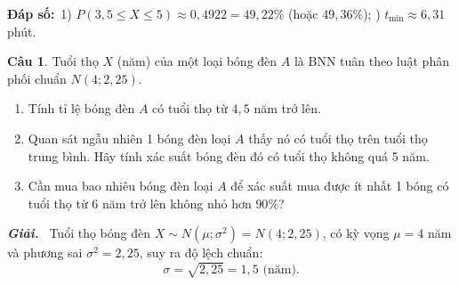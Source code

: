 \documentclass[12pt,a4paper]{article}
\theoremstyle{definition}
\newtheorem{cau}{Câu}
\newcommand{\giai}{\noindent\textbf{\textit{Giải.}}\ }
\newcommand{\dapso}[1]{\noindent\textbf{Đáp số:}\ #1}
\begin{document}
\dapso{1) $P(3{,}5 \le X \le 5) \approx 0{,}4922 = 49{,}22\%$ (hoặc $49{,}36\%$); \quad 2) $t_{\min} \approx 6{,}31$ phút.}

\vspace{1.5em}
\begin{cau}
Tuổi thọ $X$ (năm) của một loại bóng đèn $A$ là BNN tuân theo luật phân phối chuẩn $N(4; 2{,}25)$.
\begin{enumerate}[label=\alph*.]
    \item Tính tỉ lệ bóng đèn $A$ có tuổi thọ từ $4{,}5$ năm trở lên.
    \item Quan sát ngẫu nhiên 1 bóng đèn loại $A$ thấy nó có tuổi thọ trên tuổi thọ trung bình. Hãy tính xác suất bóng đèn đó có tuổi thọ không quá 5 năm.
    \item Cần mua bao nhiêu bóng đèn loại $A$ để xác suất mua được ít nhất 1 bóng có tuổi thọ từ 6 năm trở lên không nhỏ hơn $90\%$?
\end{enumerate}
\end{cau}

\giai
Tuổi thọ bóng đèn $X \sim N(\mu; \sigma^2) = N(4; 2{,}25)$, có kỳ vọng $\mu = 4$ năm và phương sai $\sigma^2 = 2{,}25$, suy ra độ lệch chuẩn:
\[
\sigma = \sqrt{2{,}25} = 1{,}5\text{ (năm)}.
\]
\end{document}
